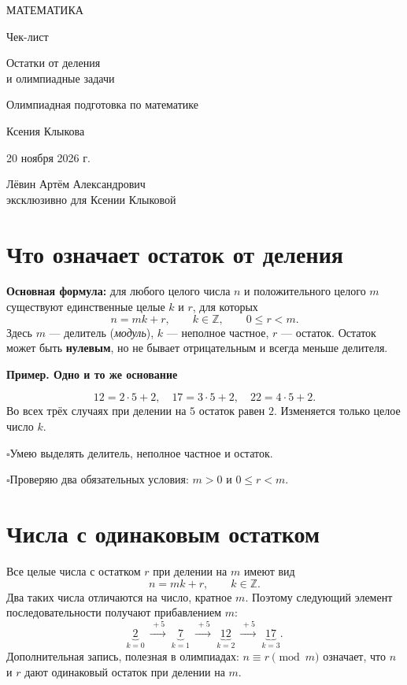 \documentclass[a4paper,12pt]{article}
\newcommand{\key}[1]{\textcolor{darkaccent}{\textbf{#1}}}
\newcommand{\checkitem}[1]{\noindent\textcolor{accent}{\(\square\)}\hspace{0.3em}#1\par}
\newcommand{\ex}[1]{\par\medskip\textcolor{darkaccent}{\textbf{Пример. #1}}\par}
\newcommand{\topic}[1]{\section{#1}}
\begin{document}
\thispagestyle{empty}
\begin{center}
\vspace*{25mm}
{\large\color{darkaccent} МАТЕМАТИКА}\par
\vspace{21mm}
{\LARGE Чек-лист}\par
\vspace{13mm}
{\Large\color{accent} Остатки от деления\\[3pt] и олимпиадные задачи}\par
\vspace{20mm}
{\normalsize Олимпиадная подготовка по математике}\par
\vfill
{\large Ксения Клыкова}\par
\vspace{14mm}
{20 ноября 2026 г.}\par
\vspace{19mm}
{\small Лёвин Артём Александрович\\[-1pt]эксклюзивно для Ксении Клыковой}\par
\vspace{19mm}
\par
\end{center}
\clearpage

\topic{Что означает остаток от деления}
\key{Основная формула:} для любого целого числа $n$ и положительного целого $m$ существуют единственные целые $k$ и $r$, для которых
\[
\boxed{n=mk+r,\qquad k\in\mathbb Z,\qquad 0\le r<m.}
\]
Здесь $m$ --- делитель (\emph{модуль}), $k$ --- неполное частное, $r$ --- остаток. Остаток может быть \textbf{нулевым}, но не бывает отрицательным и всегда меньше делителя.

\ex{Одно и то же основание}
\[
12=2\cdot5+2,\quad 17=3\cdot5+2,\quad 22=4\cdot5+2.
\]
Во всех трёх случаях при делении на $5$ остаток равен $2$. Изменяется только целое число $k$.

\checkitem{Умею выделять делитель, неполное частное и остаток.}
\checkitem{Проверяю два обязательных условия: $m>0$ и $0\le r<m$.}

\topic{Числа с одинаковым остатком}
Все целые числа с остатком $r$ при делении на $m$ имеют вид
\[
\boxed{n=mk+r,\qquad k\in\mathbb Z.}
\]
Два таких числа отличаются на число, кратное $m$. Поэтому следующий элемент последовательности получают прибавлением $m$:
\[
\underbrace{2}_{k=0}\ \xrightarrow{\,+5\,}\ \underbrace{7}_{k=1}\ \xrightarrow{\,+5\,}\ \underbrace{12}_{k=2}\ \xrightarrow{\,+5\,}\ \underbrace{17}_{k=3}.
\]
Дополнительная запись, полезная в олимпиадах: $n\equiv r\pmod m$ означает, что $n$ и $r$ дают одинаковый остаток при делении на $m$.
\end{document}
